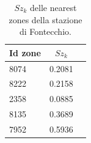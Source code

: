 \begin{table}[h]
	\centering
	\caption{$Sz_k$ delle nearest zones della stazione di Fontecchio.}
	\label{tab:szk_fontecchio}
	\begin{tabular}{|l|c|c|}
		\hline
		\multicolumn{1}{|c|}{\cellcolor{gray!50} Id zone} & {\cellcolor{gray!50} $Sz_k$} \\ \hline
		8074 & 0.2081     \\ \hline
		8222  & 0.2158   \\ \hline
		2358 &  0.0885  \\ \hline
		8135  &  0.3689       \\ \hline
		7952  &  0.5936      \\ \hline
	\end{tabular}
\end{table}
